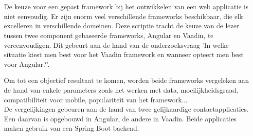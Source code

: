 
%
%

%



\chapter*{}

De keuze voor een gepast framework bij het ontwikkelen van een web applicatie is niet eenvoudig. Er zijn enorm veel verschillende frameworks beschikbaar, die elk excelleren in verschillende domeinen. Deze scriptie tracht de keuze van de lezer tussen twee component gebaseerde frameworks, Angular en Vaadin, te vereenvoudigen. Dit gebeurt aan de hand van de onderzoeksvraag 'In welke situatie kiest men best voor het Vaadin framework en wanneer opteert men best voor Angular?'.

Om tot een objectief resultaat te komen, worden beide frameworks vergeleken aan de hand van enkele parameters zoals het werken met data, moeilijkheidsgraad, compatibiliteit voor mobile, populariteit van het framework... \\
De vergelijkingen gebeuren aan de hand van twee gelijkaardige contactapplicaties. Een daarvan is opgebouwd in Angular, de andere in Vaadin. Beide applicaties maken gebruik van een Spring Boot backend. 

